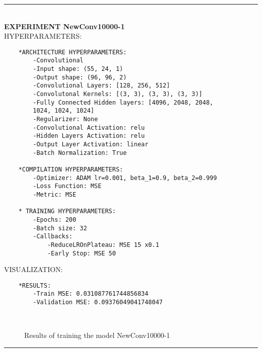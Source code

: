 \rule{0.5\textwidth}{0.5pt}\\

	{\large \textbf{EXPERIMENT NewConv10000-1}}\\
	
	{\normalsize HYPERPARAMETERS:}
	\begin{lstlisting}	
	*ARCHITECTURE HYPERPARAMETERS:
		-Convolutional
		-Input shape: (55, 24, 1)
		-Output shape: (96, 96, 2)
		-Convolutional Layers: [128, 256, 512]
		-Convolutonal Kernels: [(3, 3), (3, 3), (3, 3)]
		-Fully Connected Hidden layers: [4096, 2048, 2048, 
		1024, 1024, 1024]
		-Regularizer: None
		-Convolutional Activation: relu
		-Hidden Layers Activation: relu
		-Output Layer Activation: linear
		-Batch Normalization: True
	
	*COMPILATION HYPERPARAMETERS:
		-Optimizer: ADAM lr=0.001, beta_1=0.9, beta_2=0.999
		-Loss Function: MSE
		-Metric: MSE
	
	* TRAINING HYPERPARAMETERS:
		-Epochs: 200
		-Batch size: 32
		-Callbacks:
			-ReduceLROnPlateau: MSE 15 x0.1
			-Early Stop: MSE 50
	\end{lstlisting}
		
	{\normalsize VISUALIZATION:}
	\begin{lstlisting}
	*RESULTS:
        -Train MSE: 0.031087761744856834
        -Validation MSE: 0.09376049041748047
	\end{lstlisting}
	
	\begin{figure*}[ht!]
		\hspace{\fill}
		\hspace{\fill}
		\\
		\caption{Results of training the model NewConv10000-1}
	\end{figure*}
	
\FloatBarrier	
\rule{0.5\textwidth}{0.5pt}\\	